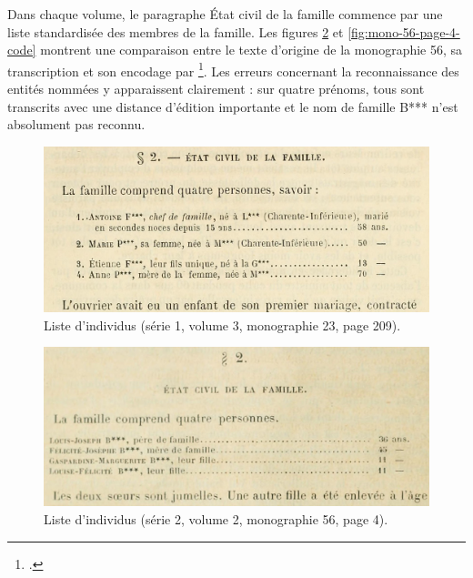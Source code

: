 Dans chaque volume, le paragraphe \og État civil de la famille \fg{} commence par une liste standardisée des membres de la famille. Les figures \ref{fig:mono-56-page-4} et \ref{fig:mono-56-page-4-code} montrent une comparaison entre le texte d'origine de la monographie 56, sa transcription et son encodage par \lse\footcite[p. 4]{mono056a}. Les erreurs concernant la reconnaissance des entités nommées y apparaissent clairement : sur quatre prénoms, tous sont transcrits avec une distance d'édition importante et le nom de famille \og B*** \fg{} n'est absolument pas reconnu.

\begin{figure}[ht]
    \centering
    \includegraphics[width=14cm]{img/mono-23-page-209.jpg}
    \caption[Liste d'individus au début du paragraphe 2 (\no{}23)]{Liste d'individus (série 1, volume 3, monographie \no{}23, page 209).}
    \label{fig:mono-23-page-209}
\end{figure}

\begin{figure}[ht]
    \centering
    \includegraphics[width=14cm]{img/mono-56-page-4.jpg}
    \caption[Liste d'individus au début du paragraphe 2 (\no{}56)]{Liste d'individus (série 2, volume 2, monographie \no{}56, page 4).}
    \label{fig:mono-56-page-4}
\end{figure}

